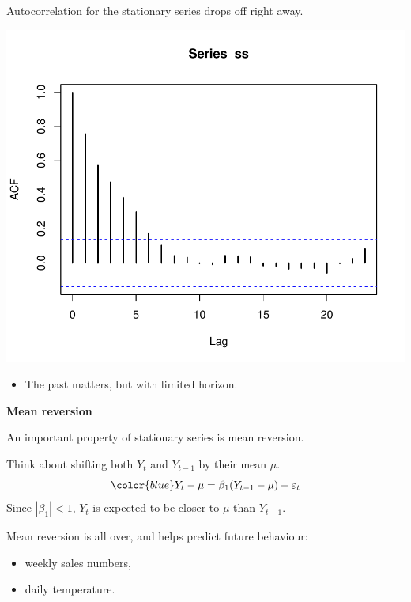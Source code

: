 \documentclass[12pt,xcolor=svgnames]{beamer}
\newcommand{\rd}{\color{red}}
\newcommand{\bl}{\color{blue}}
\newcommand{\theme}{\color{FireBrick}}
\newcommand{\sk}{\vspace{.4cm}}
\newcommand{\nochap}{\vspace{0.5cm}}
\newcommand{\nsk}{\vspace{-.4cm}}
\newcommand{\chap}[1]{{\theme \Large \bf #1} \sk}
\begin{document}
\begin{frame}
\nochap

Autocorrelation for the stationary series drops off right away.

\vspace{0.55cm}
\begin{minipage}{7cm}
\centering
\includegraphics[scale=0.55,trim=15 30 0 10]{acfstationary}
\sk
\end{minipage}\hfill
\begin{minipage}{3cm}
\nsk
\begin{itemize}
\item The past matters, but with limited horizon.
\end{itemize}
\end{minipage}

\end{frame}

\begin{frame}
\chap{Mean reversion}

An important property of stationary series is {\rd mean reversion}.

\sk
Think about shifting both $Y_t$ and $Y_{t-1}$ by their mean $\mu$.
\[ 
\bl Y_t - \mu = \beta_1 (Y_{t-1} - \mu) +\varepsilon_t
\]
Since $|\beta_1| < 1$, $Y_t$ is expected to be closer to $\mu$
than $Y_{t-1}$.

\sk 
Mean reversion is all over, and helps predict
future behaviour:
\begin{itemize}
\item weekly sales numbers,
\item daily temperature.
\end{itemize}

\end{frame}
\end{document}

